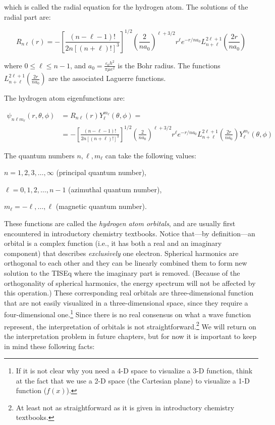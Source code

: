 \documentclass[
  9pt,
]{extbook}
\theoremstyle{definition}
\theoremstyle{definition}
\theoremstyle{definition}
\theoremstyle{remark}
\begin{document}
which is called the radial equation for the hydrogen atom. The solutions of the radial part are:

\begin{equation}
R_{n\ell}(r) = - \left[ \frac{(n - \ell - 1)!}{2n[(n+\ell)!]^3} \right]^{1/2}\left(\frac{2}{na_0}\right)^{\ell+3/2}r^{\ell} e^{-r/na_0} L_{n+\ell}^{2\ell+1}
\left( \frac{2r}{n a_0} \right)
\label{eq:HA5}
\end{equation}

where \(0 \leq \ell \leq n - 1\), and \(a_0 = \frac{\varepsilon_0 h^2}{\pi \mu e^2}\) is the Bohr radius. The functions \(L_{n+\ell}^{2\ell+1}\left(\frac{2r}{na_0}\right)\) are the associated Laguerre functions.

The hydrogen atom eigenfunctions are:

\begin{equation}
\begin{aligned}
\psi_{n\ell m_{\ell}}(r,\theta,\phi) &= R_{n\ell}(r)Y_{\ell}^{m_{\ell}}(\theta,\phi) = \\
&= - \left[ \frac{(n - \ell - 1)!}{2n[(n+\ell)!]^3} \right]^{1/2}\left(\frac{2}{na_0}\right)^{\ell+3/2}r^{\ell} e^{-r/na_0} L_{n+\ell}^{2\ell+1}
\left( \frac{2r}{n a_0} \right) Y_{\ell}^{m_{\ell}}(\theta,\phi)
\end{aligned}
\label{eq:HA6}
\end{equation}

The quantum numbers \(n,\ell,m_{\ell}\) can take the following values:

\(n=1,2,3,\ldots,\infty\) (principal quantum number),

\(\ell =0,1,2,\ldots ,n-1\) (azimuthal quantum number),

\(m_{\ell}=-\ell ,\ldots ,\ell\) (magnetic quantum number).

These functions are called the \emph{hydrogen atom orbitals}, and are usually first encountered in introductory chemistry textbooks. Notice that---by definition---an orbital is a complex function (i.e., it has both a real and an imaginary component) that describes \emph{exclusively} one electron. Spherical harmonics are orthogonal to each other and they can be linearly combined them to form new solution to the TISEq where the imaginary part is removed. (Because of the orthogonality of spherical harmonics, the energy spectrum will not be affected by this operation.) These corresponding real orbitals are three-dimensional function that are not easily visualized in a three-dimensional space, since they require a four-dimensional one.\footnote{If it is not clear why you need a 4-D space to visualize a 3-D function, think at the fact that we use a 2-D space (the Cartesian plane) to visualize a 1-D function (\(f(x)\)).} Since there is no real consensus on what a wave function represent, the interpretation of orbitals is not straightforward.\footnote{At least not as straightforward as it is given in introductory chemistry textbooks.} We will return on the interpretation problem in future chapters, but for now it is important to keep in mind these following facts:
\end{document}
